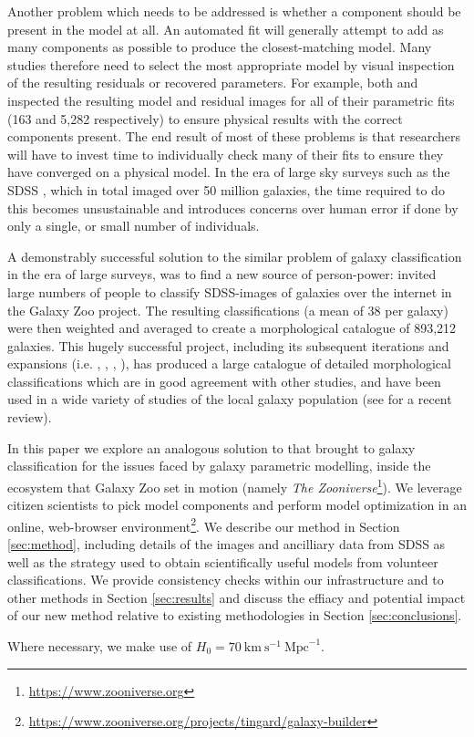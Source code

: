 \documentclass[../main.tex]{subfiles}
\begin{document}
Another problem which needs to be addressed is whether a component should be present in the model at all. An automated fit will generally attempt to add as many components as possible to produce the closest-matching model. Many studies therefore need to select the most appropriate model by visual inspection of the resulting residuals or recovered parameters. For example, both \citet{Vika2014:1408.4070v1} and \citet{2018MNRAS.473.4731K} inspected the resulting model and residual images for all of their parametric fits (163 and 5,282 respectively) to ensure physical results with the correct components present. The end result of most of these problems is that researchers will have to invest time to individually check many of their fits to ensure they have converged on a physical model. In the era of large sky surveys such as the SDSS \citep{SDSSDR7}, which in total imaged over 50 million galaxies, the time required to do this becomes unsustainable and introduces concerns over human error if done by only a single, or small number of individuals.

A demonstrably successful solution to the similar problem of galaxy classification in the era of large surveys, was to find a new source of person-power: \cite{Lintott2008:0804.4483v1} invited large numbers of people to classify SDSS-images of galaxies over the internet in the Galaxy Zoo project. The resulting classifications (a mean of 38 per galaxy) were then weighted and averaged to create a morphological catalogue of 893,212 galaxies. This hugely successful project, including its subsequent iterations and expansions (i.e. \citealt{Willett2013:1308.3496v2}, \citealt{Hart2016:1607.01019v1}, \citealt{2017MNRAS.464.4176W}, \citealt{2017MNRAS.464.4420S}), has produced a large catalogue of detailed morphological classifications which are in good agreement with other studies, and have been used in a wide variety of studies of the local galaxy population (see \citealt{2019arXiv191008177M} for a recent review).

In this paper we explore an analogous solution to that \citet{Lintott2008:0804.4483v1} brought to galaxy classification for the issues faced by galaxy parametric modelling, inside the ecosystem that Galaxy Zoo set in motion (namely {\it The Zooniverse}\footnote{\url{https://www.zooniverse.org}}). We leverage citizen scientists to pick model components and perform model optimization in an online, web-browser environment\footnote{\url{https://www.zooniverse.org/projects/tingard/galaxy-builder}}. We describe our method in Section \ref{sec:method}, including details of the images and ancilliary data from SDSS as well as the strategy used to obtain scientifically useful models from volunteer classifications. We provide consistency checks within our infrastructure and to other methods in Section \ref{sec:results} and discuss the effiacy and potential impact of our new method relative to existing methodologies in Section \ref{sec:conclusions}.

Where necessary, we make use of $H_0 = 70\ \text{km}\ \text{s}^{-1}\ \text{Mpc}^{-1}$.
\end{document}
